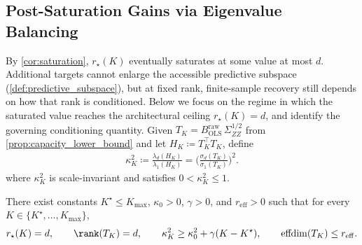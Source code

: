 \subsection{Post-Saturation Gains via Eigenvalue Balancing}
\label{sec:post_saturation_eigen}
By \cref{cor:saturation}, $r_\star(K)$ eventually saturates at some value at most $d$. 
Additional targets cannot enlarge the accessible predictive subspace (\cref{def:predictive_subspace}), but at fixed rank, finite-sample recovery still depends on how that rank is conditioned.
Below we focus on the regime in which the saturated value reaches the architectural ceiling $r_\star(K)=d$, and identify the governing conditioning quantity.
Given $T_K = B_{\mathrm{OLS}}^{\mathrm{raw}}\,\Sigma_{ZZ}^{1/2}$ from \cref{prop:capacity_lower_bound} and let $H_K \coloneqq T_K^\top T_K$, define
\begin{align}
    \kappa_K^2
    \coloneqq
    \frac{\lambda_d(H_K)}{\lambda_1(H_K)}
    =
    \bigg( \frac{\sigma_d(T_K)}
    {\sigma_1(T_K)} \bigg)^2.
    \label{eq:def_kappa}
\end{align}
where $\kappa_K^2$ is scale-invariant and satisfies $0<\kappa_K^2\le 1$.


\begin{assumption}
\label{ass:post_saturation_relative_geometry}
There exist constants $K^\star\le K_{\max}$, $\kappa_0>0$, $\gamma>0$, and
$r_{\mathrm{eff}}>0$ such that for every $K\in\{K^\star,\ldots,K_{\max}\}$,
\begin{align*}
    r_\star(K)=d,\qquad \rank(T_K)=d,\qquad \kappa_K^2 \ge \kappa_0^2+\gamma(K-K^\star),\qquad \operatorname{effdim}(T_K)\le r_{\mathrm{eff}}.
\end{align*}
\end{assumption}

